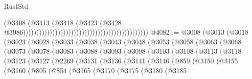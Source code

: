 \begin{lexlean}{RustStd}
\begin{coremodule}
{\begin{coremodule}
{{{{{{{{{{{{{{{{{{{{{{{{{{{{{{{{{{{{{{{{{{{{{{{{{{{{{{{                                                                                        (@3408
                                                                                          (@3413
                                                                                            (@3418
                                                                                              (@3423
                                                                                                (@3428
                                                                                                  @3986)))))))))))))))))))))))))))))))))))))))))))))))
@4082 := @3008
    (@3013
      (@3018
        (@3023
          (@3028
            (@3033
              (@3038
                (@3043
                  (@3048
                    (@3053
                      (@3058
                        (@3063
                          (@3068
                            (@3073
                              (@3078
                                (@3083
                                  (@3088
                                    (@3093
                                      (@3098
                                        (@3103
                                          (@3108
                                            (@3113
                                              (@3118
                                                (@3123
                                                  (@3127
                                                    (@2269
                                                      (@3131
                                                        (@3136
                                                          (@3141
                                                            (@3146
                                                              (@859
                                                                (@3150
                                                                  (@3155
                                                                    (@3160
                                                                      (@805
                                                                        (@854
                                                                          (@3165
                                                                            (@3170
                                                                              (@3175
                                                                                (@3180
                                                                                  (@3185
}}}}}}}}}}}}}}}}}}}}}}}}}}}}}}}}}}}}}}}}}}}}}}}}}}}}}}}
\end{coremodule}}
\end{coremodule}
\end{lexlean}
